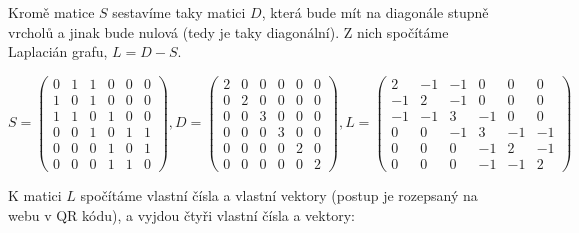 Kromě matice $S$ sestavíme taky matici $D$, která bude mít na diagonále stupně vrcholů a jinak bude nulová (tedy je taky diagonální). Z nich spočítáme Laplacián grafu, $L = D - S$.

\begin{equation}
S = 
\left( \begin{array}{cccccc}
0 & 1 & 1 & 0 & 0 & 0\\
1 & 0 & 1 & 0 & 0 & 0\\
1 & 1 & 0 & 1 & 0 & 0\\
0 & 0 & 1 & 0 & 1 & 1\\
0 & 0 & 0 & 1 & 0 & 1\\
0 & 0 & 0 & 1 & 1 & 0\end{array} \right)
%
,
%
D = 
\left( \begin{array}{cccccc}
2 & 0 & 0 & 0 & 0 & 0\\
0 & 2 & 0 & 0 & 0 & 0\\
0 & 0 & 3 & 0 & 0 & 0\\
0 & 0 & 0 & 3 & 0 & 0\\
0 & 0 & 0 & 0 & 2 & 0\\
0 & 0 & 0 & 0 & 0 & 2\end{array} \right)
%
,
%
L = 
\left( \begin{array}{cccccc}
2 & -1 & -1 & 0 & 0 & 0\\
-1 & 2 & -1 & 0 & 0 & 0\\
-1 & -1 & 3 & -1 & 0 & 0\\
0 & 0 & -1 & 3 & -1 & -1\\
0 & 0 & 0 & -1 & 2 & -1\\
0 & 0 & 0 & -1 & -1 & 2\end{array} \right)
\end{equation}

K matici $L$ spočítáme vlastní čísla a vlastní vektory (postup je rozepsaný na webu v QR kódu), a vyjdou čtyři vlastní čísla a vektory:


